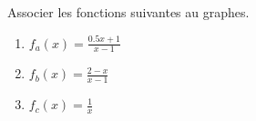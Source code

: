
\begin{exercice}\label{exosmath-0334}

    Associer les fonctions suivantes au graphes.

\begin{center}
   
\end{center}

\let\Oldtheenumi\theenumi
\renewcommand{\theenumi}{(\alph{enumi})}
\begin{multicols}{2}
    \begin{enumerate}
        \item
            \( f_a(x)=\frac{ 0.5x+1 }{ x-1 }\)
        \item
            \( f_b(x)=\frac{2-x}{ x-1 }\)
        \item
            \( f_c(x)=\frac{ 1 }{ x }\)
    \end{enumerate}
\end{multicols}
\let\theenumi\Oldtheenumi

\end{exercice}
